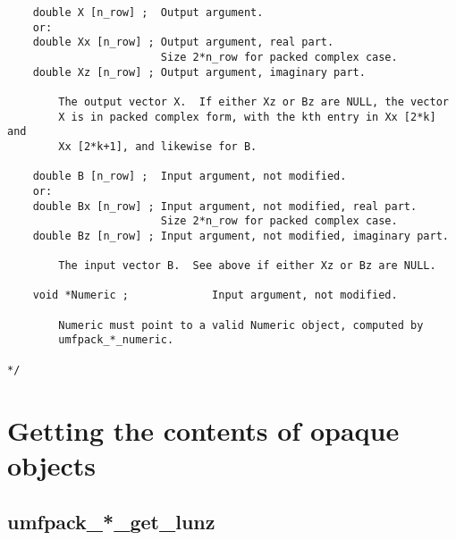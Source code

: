 \documentclass[11pt]{article}
\begin{document}
{\begin{verbatim}
    double X [n_row] ;  Output argument.
    or:
    double Xx [n_row] ; Output argument, real part.
                        Size 2*n_row for packed complex case.
    double Xz [n_row] ; Output argument, imaginary part.

        The output vector X.  If either Xz or Bz are NULL, the vector
        X is in packed complex form, with the kth entry in Xx [2*k] and
        Xx [2*k+1], and likewise for B.

    double B [n_row] ;  Input argument, not modified.
    or:
    double Bx [n_row] ; Input argument, not modified, real part.
                        Size 2*n_row for packed complex case.
    double Bz [n_row] ; Input argument, not modified, imaginary part.

        The input vector B.  See above if either Xz or Bz are NULL.

    void *Numeric ;             Input argument, not modified.

        Numeric must point to a valid Numeric object, computed by
        umfpack_*_numeric.

*/
\end{verbatim}
}

\newpage
\section{Getting the contents of opaque objects}
\label{Get}

\subsection{umfpack\_*\_get\_lunz}
\end{document}

